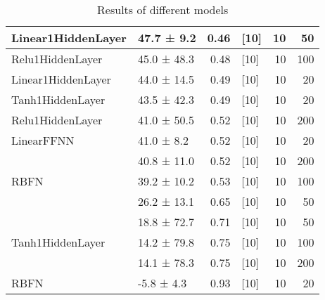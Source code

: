 \begin{table*}[h]
\begin{tabular}{llrlrr}
 \hline
Linear1HiddenLayer         & 47.7 ± 9.2  &  0.46 & [10]           &         10 &       50 \\
 \hline
Relu1HiddenLayer         & 45.0 ± 48.3 &  0.48 & [10]           &         10 &      100 \\
 \hline
Linear1HiddenLayer         & 44.0 ± 14.5 &  0.49 & [10]           &         10 &       20 \\
 \hline
Tanh1HiddenLayer         & 43.5 ± 42.3 &  0.49 & [10]           &         10 &       20 \\
 \hline
Relu1HiddenLayer         & 41.0 ± 50.5 &  0.52 & [10]           &         10 &      200 \\
 \hline
LinearFFNN         & 41.0 ± 8.2  &  0.52 & [10]           &         10 &       20 \\
 \hline
\multirow{3}{*}{RBFN}         & 40.8 ± 11.0 &  0.52 & [10]           &         10 &      200 \\
         & 39.2 ± 10.2 &  0.53 & [10]           &         10 &      100 \\
         & 26.2 ± 13.1 &  0.65 & [10]           &         10 &       50 \\
 \hline
\multirow{3}{*}{Tanh1HiddenLayer}         & 18.8 ± 72.7 &  0.71 & [10]           &         10 &       50 \\
         & 14.2 ± 79.8 &  0.75 & [10]           &         10 &      100 \\
         & 14.1 ± 78.3 &  0.75 & [10]           &         10 &      200 \\
 \hline
RBFN         & -5.8 ± 4.3  &  0.93 & [10]           &         10 &       20 \\
\hline
\end{tabular}
        \caption{Results of different models}
        \label{models}
    \end{table*}
    
